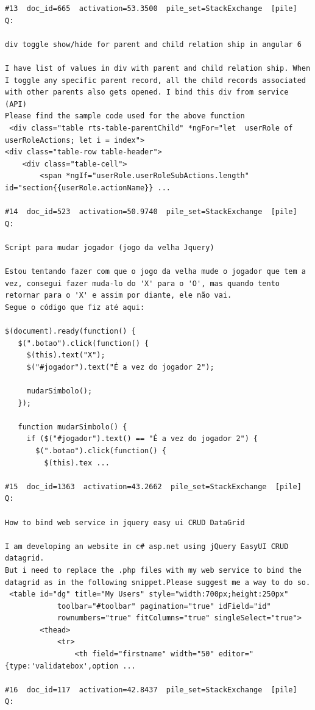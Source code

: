 \begin{verbatim}
#13  doc_id=665  activation=53.3500  pile_set=StackExchange  [pile]
Q:

div toggle show/hide for parent and child relation ship in angular 6

I have list of values in div with parent and child relation ship. When I toggle any specific parent record, all the child records associated with other parents also gets opened. I bind this div from service (API)
Please find the sample code used for the above function
 <div class="table rts-table-parentChild" *ngFor="let  userRole of userRoleActions; let i = index">
<div class="table-row table-header">
    <div class="table-cell">
        <span *ngIf="userRole.userRoleSubActions.length" id="section{{userRole.actionName}} ...

#14  doc_id=523  activation=50.9740  pile_set=StackExchange  [pile]
Q:

Script para mudar jogador (jogo da velha Jquery)

Estou tentando fazer com que o jogo da velha mude o jogador que tem a vez, consegui fazer muda-lo do 'X' para o 'O', mas quando tento retornar para o 'X' e assim por diante, ele não vai.
Segue o código que fiz até aqui:

$(document).ready(function() {
   $(".botao").click(function() {
     $(this).text("X");
     $("#jogador").text("É a vez do jogador 2");

     mudarSimbolo();
   });

   function mudarSimbolo() {
     if ($("#jogador").text() == "É a vez do jogador 2") {
       $(".botao").click(function() {
         $(this).tex ...

#15  doc_id=1363  activation=43.2662  pile_set=StackExchange  [pile]
Q:

How to bind web service in jquery easy ui CRUD DataGrid

I am developing an website in c# asp.net using jQuery EasyUI CRUD datagrid.
But i need to replace the .php files with my web service to bind the datagrid as in the following snippet.Please suggest me a way to do so.
 <table id="dg" title="My Users" style="width:700px;height:250px"  
            toolbar="#toolbar" pagination="true" idField="id"  
            rownumbers="true" fitColumns="true" singleSelect="true">  
        <thead>  
            <tr>  
                <th field="firstname" width="50" editor="{type:'validatebox',option ...

#16  doc_id=117  activation=42.8437  pile_set=StackExchange  [pile]
Q:


\end{verbatim}
